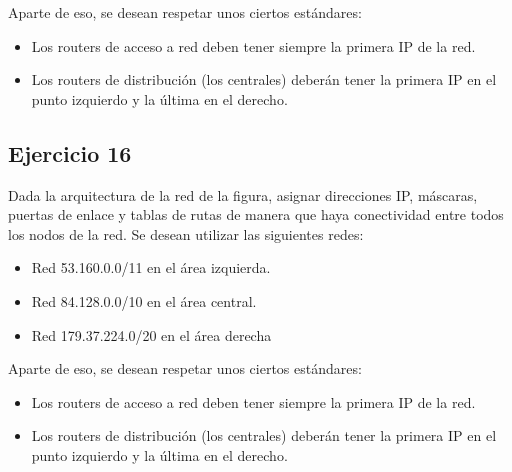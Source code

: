 \documentclass[letterpaper,10pt,spanish]{sphinxmanual}
\begin{document}
\begin{figure}[htbp]
\centering

\noindent{}
\end{figure}

\sphinxAtStartPar
Aparte de eso, se desean respetar unos ciertos estándares:
\begin{itemize}
\item {} 
\sphinxAtStartPar
Los routers de acceso a red deben tener siempre la primera IP de la red.

\item {} 
\sphinxAtStartPar
Los routers de distribución (los centrales) deberán tener la primera IP en el punto izquierdo y la última en el derecho.

\end{itemize}


\subsection{Ejercicio 16}
\label{\detokenize{t2_integracion_elementos/ejercicios_subredes_ipv4/ejercicios_dos_router:ejercicio-16}}
\sphinxAtStartPar
Dada la arquitectura de la red de la figura, asignar direcciones IP, máscaras, puertas de enlace y tablas de rutas de manera que haya conectividad entre todos
los nodos de la red. Se desean utilizar las siguientes redes:
\begin{itemize}
\item {} 
\sphinxAtStartPar
Red 53.160.0.0/11 en el área izquierda.

\item {} 
\sphinxAtStartPar
Red 84.128.0.0/10 en el área central.

\item {} 
\sphinxAtStartPar
Red 179.37.224.0/20 en el área derecha

\end{itemize}

\begin{figure}[htbp]
\centering

\noindent{}
\end{figure}

\sphinxAtStartPar
Aparte de eso, se desean respetar unos ciertos estándares:
\begin{itemize}
\item {} 
\sphinxAtStartPar
Los routers de acceso a red deben tener siempre la primera IP de la red.

\item {} 
\sphinxAtStartPar
Los routers de distribución (los centrales) deberán tener la primera IP en el punto izquierdo y la última en el derecho.

\end{itemize}
\end{document}
